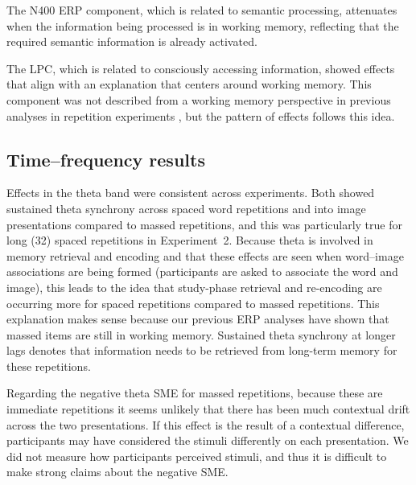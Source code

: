 
The N400 ERP component, which is related to semantic processing, attenuates when the information being processed is in working memory, reflecting that the required semantic information is already activated.


The LPC, which is related to consciously accessing information, showed effects that align with an explanation that centers around working memory.  This component was not described from a working memory perspective in previous analyses in repetition experiments \cite[rather, they discussed it as ``template matching'']{OlicEtal2000,VanSEtal2007}, but the pattern of effects follows this idea.


\subsection{Time--frequency results}

Effects in the theta band were consistent across experiments.  Both showed sustained theta synchrony across spaced word repetitions and into image presentations compared to massed repetitions, and this was particularly true for long (32) spaced repetitions in Experiment~2.  Because theta is involved in memory retrieval and encoding and that these effects are seen when word--image associations are being formed (participants are asked to associate the word and image), this leads to the idea that study-phase retrieval and re-encoding are occurring more for spaced repetitions compared to massed repetitions.  This explanation makes sense because our previous ERP analyses have shown that massed items are still in working memory.  Sustained theta synchrony at longer lags denotes that information needs to be retrieved from long-term memory for these repetitions.

Regarding the negative theta SME for massed repetitions, because these are immediate repetitions it seems unlikely that there has been much contextual drift across the two presentations.  If this effect is the result of a contextual difference, participants may have considered the stimuli differently on each presentation.  We did not measure how participants perceived stimuli, and thus it is difficult to make strong claims about the negative SME.



